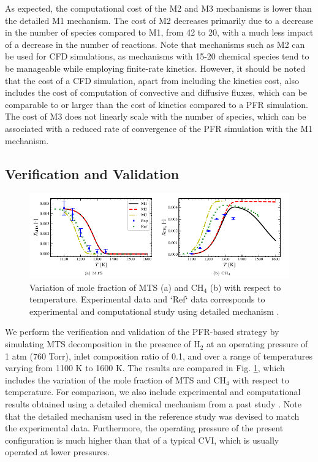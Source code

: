\documentclass[final, letterpaper, square, comma, numbers, sort&compress]{elsarticle}
\begin{document}
As expected, the computational cost of the M2 and M3 mechanisms is lower than the detailed M1 mechanism. The cost of M2 decreases primarily due to a decrease in the number of species compared to M1, from 42 to 20, with a much less impact of a decrease in the number of reactions. Note that mechanisms such as M2 can be used for CFD simulations, as mechanisms with 15-20 chemical species tend to be manageable while employing finite-rate kinetics. However, it should be noted that the cost of a CFD simulation, apart from including the kinetics cost, also includes the cost of computation of convective and diffusive fluxes, which can be comparable to or larger than the cost of kinetics compared to a PFR simulation. The cost of M3 does not linearly scale with the number of species, which can be associated with a reduced rate of convergence of the PFR simulation with the M1 mechanism.

\subsection{Verification and Validation}
\begin{figure}[t] %
    \centering\includegraphics[width=\textwidth]{ph-fig5.png}
    \caption{Variation of mole fraction of MTS (a) and CH$_4$ (b) with respect to temperature. Experimental data and ‘Ref‘ data corresponds to experimental and computational study using detailed mechanism \cite{Dang2022}.}
\label{fig:5}
\end{figure}

We perform the verification and validation of the PFR-based strategy by simulating MTS decomposition in the presence of H$_2$ at an operating pressure of 1 atm (760 Torr), inlet composition ratio of 0.1, and over a range of temperatures varying from 1100 K to 1600 K. The results are compared in Fig. \ref{fig:5}, which includes the variation of the mole fraction of MTS and CH$_4$ with respect to temperature. For comparison, we also include experimental and computational results obtained using a detailed chemical mechanism from a past study \cite{Dang2022}. Note that the detailed mechanism used in the reference study was devised to match the experimental data. Furthermore, the operating pressure of the present configuration is much higher than that of a typical CVI, which is usually operated at lower pressures. 
\end{document}
